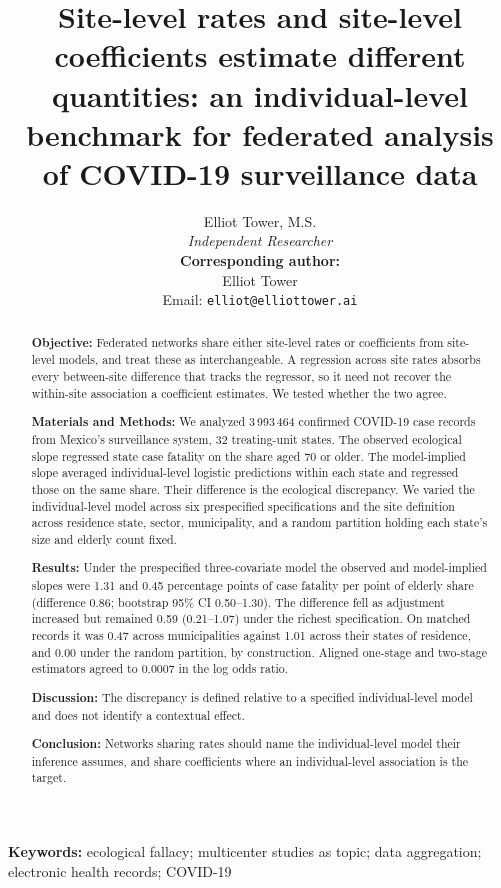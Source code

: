 \documentclass[11pt]{article}
\title{Site-level rates and site-level coefficients estimate different\\
quantities: an individual-level benchmark for federated analysis\\
of COVID-19 surveillance data}
\author{Elliot Tower, M.S.\\
\textit{Independent Researcher}\\[6pt]
\textbf{Corresponding author:}\\
Elliot Tower\\
Email: \texttt{elliot@elliottower.ai}}
\date{}
\begin{document}
\maketitle

\begin{abstract}
\noindent\textbf{Objective:}
Federated networks share either site-level rates or coefficients from
site-level models, and treat these as interchangeable.  A regression
across site rates absorbs every between-site difference that tracks the
regressor, so it need not recover the within-site association a
coefficient estimates.  We tested whether the two agree.

\noindent\textbf{Materials and Methods:}
We analyzed 3\,993\,464 confirmed COVID-19 case records from Mexico's
surveillance system, 32 treating-unit states.  The observed
ecological slope regressed state case fatality on the share aged 70 or
older.  The model-implied slope averaged individual-level logistic
predictions within each state and regressed those on the same share.
Their difference is the ecological discrepancy.  We varied the
individual-level model across six prespecified specifications and the
site definition across residence state, sector, municipality, and a
random partition holding each state's size and elderly count fixed.

\noindent\textbf{Results:}
Under the prespecified three-covariate model the observed and
model-implied slopes were 1.31 and 0.45 percentage points of case
fatality per point of elderly share (difference 0.86; bootstrap 95\% CI
0.50--1.30).  The difference fell as adjustment increased but remained
0.59 (0.21--1.07) under the richest specification.  On matched records it
was 0.47 across municipalities against 1.01 across their states of
residence, and 0.00 under the random partition, by construction.  Aligned one-stage and two-stage estimators
agreed to 0.0007 in the log odds ratio.

\noindent\textbf{Discussion:}
The discrepancy is defined relative to a specified individual-level model
and does not identify a contextual effect.

\noindent\textbf{Conclusion:}
Networks sharing rates should name the individual-level model their inference
assumes, and share coefficients where an individual-level
association is the target.
\end{abstract}

\noindent\textbf{Keywords:} ecological fallacy; multicenter studies as topic; data aggregation;
electronic health records; COVID-19
\end{document}
